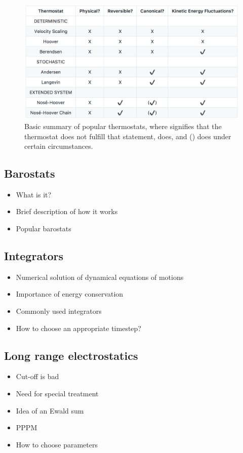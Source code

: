 \documentclass[9pt,bestpractices]{livecoms}
\begin{document}
\begin{figure}[h]
\centering
\includegraphics[width=\linewidth]{thermostat_summary.pdf}
    \caption{Basic summary of popular thermostats, where  signifies
    that the thermostat does not fulfill that statement,  does, and
    () does under certain circumstances.}
\label{tstat_summary}
\end{figure}

\subsection{Barostats}
\label{sec:barostats}
\begin{itemize}
\item What is it?
\item Brief description of how it works
\item Popular barostats
\end{itemize}

\subsection{Integrators}
\label{sec:integrators}
\begin{itemize}
\item Numerical solution of dynamical equations of motions
\item Importance of energy conservation
\item Commonly used integrators
\item How to choose an appropriate timestep?
\end{itemize}

\subsection{Long range electrostatics}
\label{sec:lr_electrostatics}
\begin{itemize}
\item Cut-off is bad
\item Need for special treatment
\item Idea of an Ewald sum
\item PPPM
\item How to choose parameters
\end{itemize}
\end{document}
